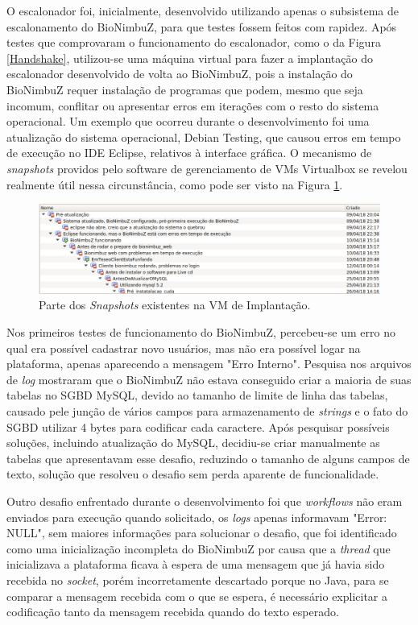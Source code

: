 O escalonador foi, inicialmente, desenvolvido utilizando apenas o subsistema de escalonamento do BioNimbuZ, para que testes fossem feitos com rapidez. Após testes que comprovaram o funcionamento do escalonador, como o da Figura \ref{Handshake}, utilizou-se uma máquina virtual para fazer a implantação do escalonador desenvolvido de volta ao BioNimbuZ, pois a instalação do BioNimbuZ requer instalação de programas que podem, mesmo que seja incomum, conflitar ou apresentar erros em iterações com o resto do sistema operacional. Um exemplo que ocorreu durante o desenvolvimento foi uma atualização do sistema operacional, Debian\cite{Debian} Testing\cite{DebianTesting}, que causou erros em tempo de execução no \acrfull{IDE} Eclipse\cite{JavaEclipse}, relativos à interface gráfica. O mecanismo de \textit{snapshots} providos pelo software de gerenciamento de \acrshort{VM}s Virtualbox\cite{VirtualBox} se revelou realmente útil nessa circunstância, como pode ser visto na Figura \ref{Snapshots}.

\begin{figure}[htbp]
	\centerline{\includegraphics[width=16cm]{img/Snapshots.png}}
	\caption{Parte dos \textit{Snapshots} existentes na \acrshort{VM} de Implantação.}
	\label{Snapshots}
\end{figure}

Nos primeiros testes de funcionamento do BioNimbuZ, percebeu-se um erro no qual era possível cadastrar novo usuários, mas não era possível logar na plataforma, apenas aparecendo a mensagem "Erro Interno". Pesquisa nos arquivos de \textit{log} mostraram que o BioNimbuZ não estava conseguido criar a maioria de suas tabelas no \acrfull{SGBD} MySQL, devido ao tamanho de limite de linha das tabelas, causado pele junção de vários campos para armazenamento de \textit{strings} e o fato do \acrshort{SGBD} utilizar 4 bytes para codificar cada caractere. Após pesquisar possíveis soluções, incluindo atualização do MySQL, decidiu-se criar manualmente as tabelas que apresentavam esse desafio, reduzindo o tamanho de alguns campos de texto, solução que resolveu o desafio sem perda aparente de funcionalidade.

Outro desafio enfrentado durante o desenvolvimento foi que \textit{workflows} não eram enviados para execução quando solicitado, os \textit{logs} apenas informavam "Error: NULL", sem maiores informações para solucionar o desafio, que foi identificado como uma inicialização incompleta do BioNimbuZ por causa que a \textit{thread} que inicializava a plataforma ficava à espera de uma mensagem que já havia sido recebida no \textit{socket}, porém incorretamente descartado porque no Java, para se comparar a mensagem recebida com o que se espera, é necessário explicitar a codificação tanto da mensagem recebida quando do texto esperado.

